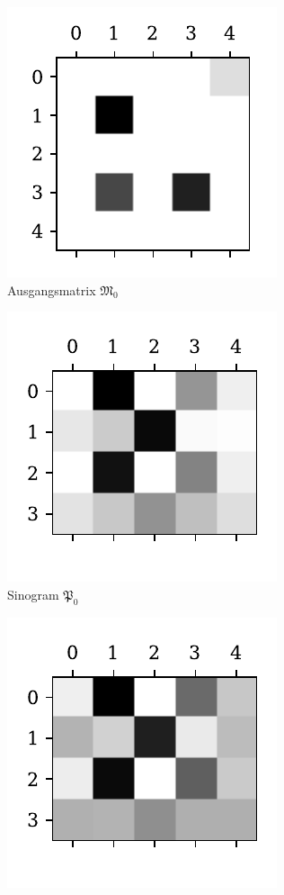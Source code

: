 \documentclass[slug=PET, room=Andreas-Schubert-Bau\,\ 424A, supervisor=Carsten\ Bittrich, coursedate=10.\ 01.\ 2020]{../../Lab_Report_LaTeX/lab_report}
\begin{document}
\begin{figure}[htp]
  \centering
  \begin{subfigure}[t]{.25\textwidth}
    \centering
    \includegraphics[width=.6\textwidth]{../auswertung/figs/theory/source.pdf}
    \caption{Ausgangsmatrix \(\mathfrak{M}_0\)}
    \label{fig:theory-source}
  \end{subfigure}
  \begin{subfigure}[t]{.25\textwidth}
    \centering
    \includegraphics[width=.6\textwidth]{../auswertung/figs/theory/projection.pdf}
    \caption{Sinogram \(\mathfrak{P}_0\)}
    \label{fig:theory-projection}
  \end{subfigure}
  \begin{subfigure}[t]{.25\textwidth}
    \centering
    \includegraphics[width=.6\textwidth]{../auswertung/figs/theory/convoluted.pdf}

\end{subfigure}
\end{figure}
\end{document}
